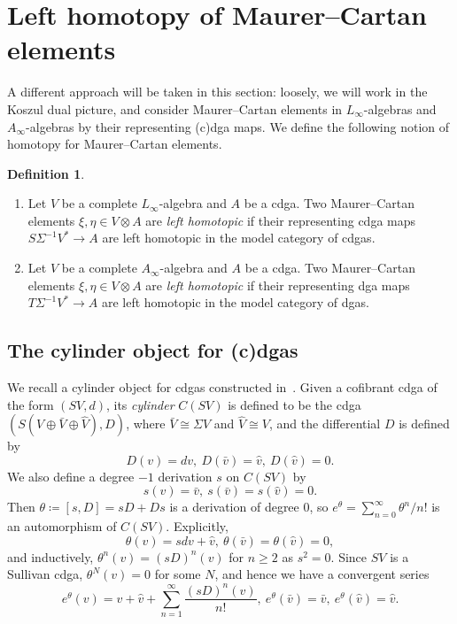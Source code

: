\documentclass[a4paper,reqno]{amsart}
\theoremstyle{plain}
\theoremstyle{definition}
\newtheorem{defn}[thm]{Definition}
\theoremstyle{remark}
\begin{document}
\section{Left homotopy of Maurer--Cartan elements}
\label{left_cdga}

A different approach will be taken in this section: loosely, we will work in the Koszul dual picture, and consider Maurer--Cartan elements in $L_{\infty}$-algebras and $A_{\infty}$-algebras by their representing (c)dga maps. 
We define the following notion of homotopy for Maurer--Cartan elements.

\begin{defn} \hfill
  \begin{enumerate}
    \item Let $V$ be a complete $L_{\infty}$-algebra and $A$ be a cdga. 
      Two Maurer--Cartan elements $\xi, \eta \in V \otimes A$ are \emph{left homotopic} if their representing cdga maps $S\Sigma^{-1}V^* \to A$ are left homotopic in the model category of cdgas.
    \item Let $V$ be a complete $A_{\infty}$-algebra and $A$ be a cdga. 
      Two Maurer--Cartan elements $\xi, \eta \in V \otimes A$ are \emph{left homotopic} if their representing dga maps $T\Sigma^{-1}V^* \to A$ are left homotopic in the model category of dgas.
  \end{enumerate}
\end{defn}

\subsection{The cylinder object for (c)dgas}

We recall a cylinder object for cdgas constructed in~\cite[Section 2.2]{fot08}.
Given a cofibrant cdga of the form $(SV, d)$, its \emph{cylinder} $C(SV)$ is defined to be the cdga $(S(V \oplus \bar{V} \oplus \widehat{V}), D)$, where $\bar{V} \cong \Sigma V$ and $\widehat{V} \cong V$, and the differential $D$ is defined by
\[
  D(v) = dv,\ D(\bar{v}) = \widehat{v},\ D(\widehat{v}) = 0.
\]
We also define a degree $-1$ derivation $s$ on $C(SV)$ by 
\[
  s(v) = \bar{v},\ s(\bar{v}) = s(\widehat{v}) = 0.
\]
Then $\theta \coloneqq [s,D] = sD + Ds$ is a derivation of degree 0, so $e^{\theta} = \sum_{n=0}^{\infty} \theta^n / n!$ is an automorphism of $C(SV)$. 
Explicitly, 
\[
  \theta(v) = sdv + \widehat{v},\ \theta(\bar{v}) = \theta(\widehat{v}) = 0,
\]
and inductively, $\theta^n (v) = (sD)^n (v)$ for $n \geq 2$ as $s^2 = 0$. Since $SV$ is a Sullivan cdga, $\theta^N (v) = 0$ for some $N$, and hence we have a convergent series 
\begin{equation}
  \label{eq:exptheta}
  e^{\theta} (v) = v + \widehat{v} + \sum_{n=1}^{\infty} \frac{(sD)^n(v)}{n!},\ 
  e^{\theta} (\bar{v}) = \bar{v},\ 
  e^{\theta} (\widehat{v}) = \widehat{v}.
\end{equation}
\end{document}
